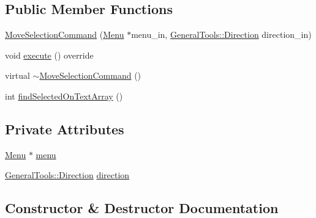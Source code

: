 \subsection*{Public Member Functions}
\begin{DoxyCompactItemize}
\item 
\hyperlink{class_move_selection_command_ab1da9eabfb2219e76ff24269c3d2d0af}{Move\+Selection\+Command} (\hyperlink{class_menu}{Menu} $\ast$menu\+\_\+in, \hyperlink{namespace_general_tools_afedc3bd242369903830dec92c3ad569b}{General\+Tools\+::\+Direction} direction\+\_\+in)
\item 
void \hyperlink{class_move_selection_command_a0d2117e50adfe980744b3ca883ca7fc5}{execute} () override
\item 
virtual \hyperlink{class_move_selection_command_ae014898c6e01dd18668f79fd96d9b670}{$\sim$\+Move\+Selection\+Command} ()
\item 
int \hyperlink{class_move_selection_command_a6a9d0bed09292f4465c3a09a847ed0be}{find\+Selected\+On\+Text\+Array} ()
\end{DoxyCompactItemize}
\subsection*{Private Attributes}
\begin{DoxyCompactItemize}
\item 
\hyperlink{class_menu}{Menu} $\ast$ \hyperlink{class_move_selection_command_a1d6727564354bf48e4d77f1f9b27680d}{menu}
\item 
\hyperlink{namespace_general_tools_afedc3bd242369903830dec92c3ad569b}{General\+Tools\+::\+Direction} \hyperlink{class_move_selection_command_a27a2a41486ddb096f3a1f350395ea0ea}{direction}
\end{DoxyCompactItemize}


\subsection{Constructor \& Destructor Documentation}
\hypertarget{class_move_selection_command_ab1da9eabfb2219e76ff24269c3d2d0af}{}
